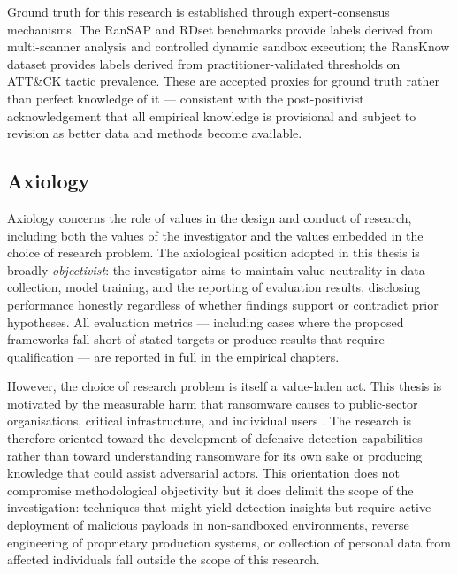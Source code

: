 Ground truth for this research is established through expert-consensus mechanisms.
The RanSAP and RDset benchmarks provide labels derived from multi-scanner analysis and controlled
dynamic sandbox execution; the RansKnow dataset provides labels derived from practitioner-validated
thresholds on ATT\&CK tactic prevalence.
These are accepted proxies for ground truth rather than perfect knowledge of it — consistent with
the post-positivist acknowledgement that all empirical knowledge is provisional and subject to
revision as better data and methods become available.

\subsection{Axiology}
\label{sec:axiology}

Axiology concerns the role of values in the design and conduct of research, including both the
values of the investigator and the values embedded in the choice of research problem.
The axiological position adopted in this thesis is broadly \emph{objectivist}: the investigator
aims to maintain value-neutrality in data collection, model training, and the reporting of
evaluation results, disclosing performance honestly regardless of whether findings support or
contradict prior hypotheses.
All evaluation metrics — including cases where the proposed frameworks fall short of stated targets
or produce results that require qualification — are reported in full in the empirical chapters.

However, the choice of research problem is itself a value-laden act.
This thesis is motivated by the measurable harm that ransomware causes to public-sector
organisations, critical infrastructure, and individual users \cite{europol2020iocta,
beaman2021ransomware}.
The research is therefore oriented toward the development of defensive detection capabilities rather
than toward understanding ransomware for its own sake or producing knowledge that could assist
adversarial actors.
This orientation does not compromise methodological objectivity but it does delimit the scope of
the investigation: techniques that might yield detection insights but require active deployment of
malicious payloads in non-sandboxed environments, reverse engineering of proprietary production
systems, or collection of personal data from affected individuals fall outside the scope of this
research.

